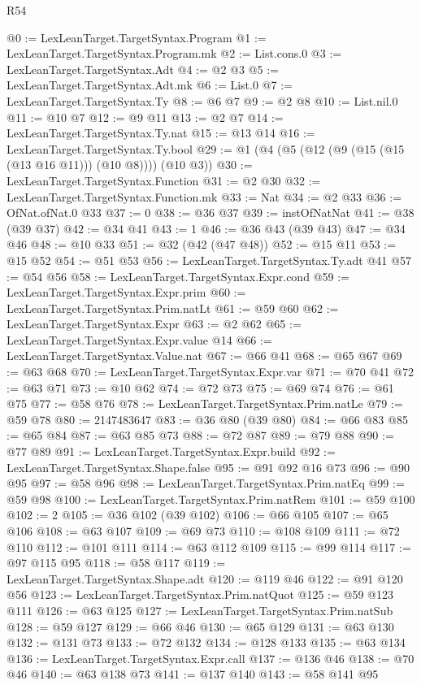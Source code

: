 \begin{lexlean}{R54}
\begin{coremodule}
@0 := LexLeanTarget.TargetSyntax.Program
@1 := LexLeanTarget.TargetSyntax.Program.mk
@2 := List.cons.{0}
@3 := LexLeanTarget.TargetSyntax.Adt
@4 := @2 @3
@5 := LexLeanTarget.TargetSyntax.Adt.mk
@6 := List.{0}
@7 := LexLeanTarget.TargetSyntax.Ty
@8 := @6 @7
@9 := @2 @8
@10 := List.nil.{0}
@11 := @10 @7
@12 := @9 @11
@13 := @2 @7
@14 := LexLeanTarget.TargetSyntax.Ty.nat
@15 := @13 @14
@16 := LexLeanTarget.TargetSyntax.Ty.bool
@29 := @1 (@4 (@5 (@12 (@9 (@15 (@15 (@13 @16 @11))) (@10 @8)))) (@10 @3))
@30 := LexLeanTarget.TargetSyntax.Function
@31 := @2 @30
@32 := LexLeanTarget.TargetSyntax.Function.mk
@33 := Nat
@34 := @2 @33
@36 := OfNat.ofNat.{0} @33
@37 := 0
@38 := @36 @37
@39 := instOfNatNat
@41 := @38 (@39 @37)
@42 := @34 @41
@43 := 1
@46 := @36 @43 (@39 @43)
@47 := @34 @46
@48 := @10 @33
@51 := @32 (@42 (@47 @48))
@52 := @15 @11
@53 := @15 @52
@54 := @51 @53
@56 := LexLeanTarget.TargetSyntax.Ty.adt @41
@57 := @54 @56
@58 := LexLeanTarget.TargetSyntax.Expr.cond
@59 := LexLeanTarget.TargetSyntax.Expr.prim
@60 := LexLeanTarget.TargetSyntax.Prim.natLt
@61 := @59 @60
@62 := LexLeanTarget.TargetSyntax.Expr
@63 := @2 @62
@65 := LexLeanTarget.TargetSyntax.Expr.value @14
@66 := LexLeanTarget.TargetSyntax.Value.nat
@67 := @66 @41
@68 := @65 @67
@69 := @63 @68
@70 := LexLeanTarget.TargetSyntax.Expr.var
@71 := @70 @41
@72 := @63 @71
@73 := @10 @62
@74 := @72 @73
@75 := @69 @74
@76 := @61 @75
@77 := @58 @76
@78 := LexLeanTarget.TargetSyntax.Prim.natLe
@79 := @59 @78
@80 := 2147483647
@83 := @36 @80 (@39 @80)
@84 := @66 @83
@85 := @65 @84
@87 := @63 @85 @73
@88 := @72 @87
@89 := @79 @88
@90 := @77 @89
@91 := LexLeanTarget.TargetSyntax.Expr.build
@92 := LexLeanTarget.TargetSyntax.Shape.false
@95 := @91 @92 @16 @73
@96 := @90 @95
@97 := @58 @96
@98 := LexLeanTarget.TargetSyntax.Prim.natEq
@99 := @59 @98
@100 := LexLeanTarget.TargetSyntax.Prim.natRem
@101 := @59 @100
@102 := 2
@105 := @36 @102 (@39 @102)
@106 := @66 @105
@107 := @65 @106
@108 := @63 @107
@109 := @69 @73
@110 := @108 @109
@111 := @72 @110
@112 := @101 @111
@114 := @63 @112 @109
@115 := @99 @114
@117 := @97 @115 @95
@118 := @58 @117
@119 := LexLeanTarget.TargetSyntax.Shape.adt
@120 := @119 @46
@122 := @91 @120 @56
@123 := LexLeanTarget.TargetSyntax.Prim.natQuot
@125 := @59 @123 @111
@126 := @63 @125
@127 := LexLeanTarget.TargetSyntax.Prim.natSub
@128 := @59 @127
@129 := @66 @46
@130 := @65 @129
@131 := @63 @130
@132 := @131 @73
@133 := @72 @132
@134 := @128 @133
@135 := @63 @134
@136 := LexLeanTarget.TargetSyntax.Expr.call
@137 := @136 @46
@138 := @70 @46
@140 := @63 @138 @73
@141 := @137 @140
@143 := @58 @141 @95

\end{coremodule}
\end{lexlean}
